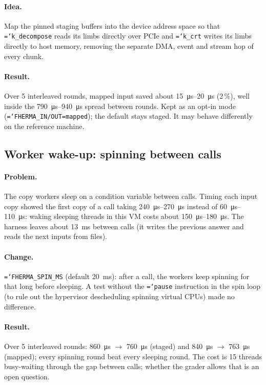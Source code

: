 \documentclass[11pt,a4paper]{article}
\newcommand{\code}[1]{\texttt{\hyphenchar\font=`\-\relax #1}}
\newcommand{\us}[1]{\SI{#1}{\micro\second}}
\newcommand{\ms}[1]{\SI{#1}{\milli\second}}
\begin{document}
\paragraph{Idea.} Map the pinned staging buffers into the device address space so
that \code{k\_decompose} reads its limbs directly over PCIe and \code{k\_crt} writes
its limbs directly to host memory, removing the separate DMA, event and stream
hop of every chunk.

\paragraph{Result.} Over 5 interleaved rounds, mapped input saved about
\us{15}--\us{20} (2\,\%), well inside the \us{790}--\us{940} spread between rounds.
Kept as an opt-in mode (\code{FHERMA\_IN/OUT=mapped}); the default stays staged.
It may behave differently on the reference machine.

\subsection{Worker wake-up: spinning between calls}

\paragraph{Problem.} The copy workers sleep on a condition variable between calls.
Timing each input copy showed the first copy of a call taking \us{240}--\us{270}
instead of \us{60}--\us{110}: waking sleeping threads in this VM costs about
\us{150}--\us{180}. The harness leaves about \ms{13} between calls (it writes the
previous answer and reads the next inputs from files).

\paragraph{Change.} \code{FHERMA\_SPIN\_MS} (default \SI{20}{\milli\second}): after a
call, the workers keep spinning for that long before sleeping. A test without the
\code{pause} instruction in the spin loop (to rule out the hypervisor descheduling
spinning virtual CPUs) made no difference.

\paragraph{Result.} Over 5 interleaved rounds: \us{860} $\to$ \us{760} (staged) and
\us{840} $\to$ \us{763} (mapped); every spinning round beat every sleeping round. The
cost is 15 threads busy-waiting through the gap between calls; whether the grader
allows that is an open question.
\end{document}
